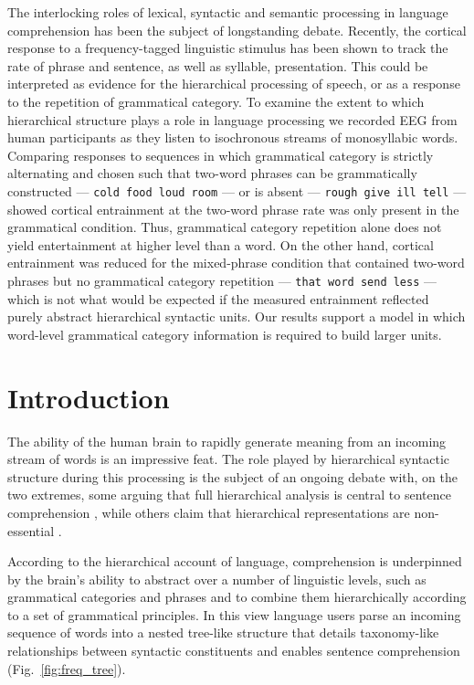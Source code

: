 \documentclass[10pt,letterpaper]{article}
\newcommand{\citet}[1]{\cite{#1}}
\begin{document}
The interlocking roles of lexical, syntactic and semantic processing
in language comprehension has been the subject of longstanding
debate. Recently, the cortical response to a frequency-tagged
linguistic stimulus has been shown to track the rate of phrase and
sentence, as well as syllable, presentation. This could be interpreted
as evidence for the hierarchical processing of speech, or as a
response to the repetition of grammatical category. To examine the
extent to which hierarchical structure plays a role in language
processing we recorded EEG from human participants as they listen to
isochronous streams of monosyllabic words. Comparing responses to
sequences in which grammatical category is strictly alternating and
chosen such that two-word phrases can be grammatically constructed ---
\texttt{cold food loud room} --- or is absent --- \texttt{rough give
  ill tell} --- showed cortical entrainment at the two-word phrase
rate was only present in the grammatical condition. Thus, grammatical
category repetition alone does not yield entertainment at higher level
than a word. On the other hand, cortical entrainment was reduced for
the mixed-phrase condition that contained two-word phrases but no
grammatical category repetition --- \texttt{that word send less} ---
which is not what would be expected if the measured entrainment
reflected purely abstract hierarchical syntactic units. Our results
support a model in which word-level grammatical category information
is required to build larger units.

\section*{Introduction}

The ability of the human brain to rapidly generate meaning from an
incoming stream of words is an impressive feat. The role played by
hierarchical syntactic structure during this processing is the subject
of an ongoing debate with, on the two extremes, some arguing that full
hierarchical analysis is central to sentence comprehension
\citet{Chomsky1995,BerwickEtAl2013, EveraertEtAl2015}, while others
claim that hierarchical representations are non-essential
\cite{FrankEtAl2012, FrankBod2011, FrankYang2018,
  FrankChristiansen2018}.

According to the hierarchical account of language, comprehension is
underpinned by the brain's ability to abstract over a number of
linguistic levels, such as grammatical categories and phrases and to
combine them hierarchically according to a set of grammatical
principles. In this view language users parse an incoming sequence of
words into a nested tree-like structure that details taxonomy-like
relationships between syntactic constituents and enables sentence
comprehension (Fig.~\ref{fig:freq_tree}).
\end{document}

